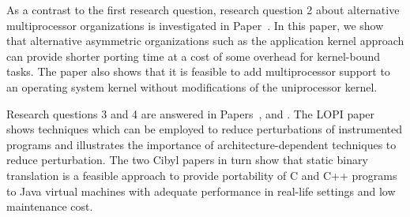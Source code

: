 As a contrast to the first research question, research question 2 about
alternative multiprocessor organizations is investigated in
Paper~. In this paper, we show that alternative
asymmetric organizations such as the application kernel approach can provide
shorter porting time at a cost of some overhead for kernel-bound tasks. The
paper also shows that it is feasible to add multiprocessor support to an
operating system kernel without modifications of the uniprocessor kernel.

Research questions 3 and 4 are answered in Papers~,
 and . The LOPI paper shows
techniques which can be employed to reduce perturbations of instrumented
programs and illustrates the importance of architecture-dependent techniques
to reduce perturbation. The two Cibyl papers in turn show that static binary
translation is a feasible approach to provide portability of C and C++
programs to Java virtual machines with adequate performance in real-life
settings and low maintenance cost.


